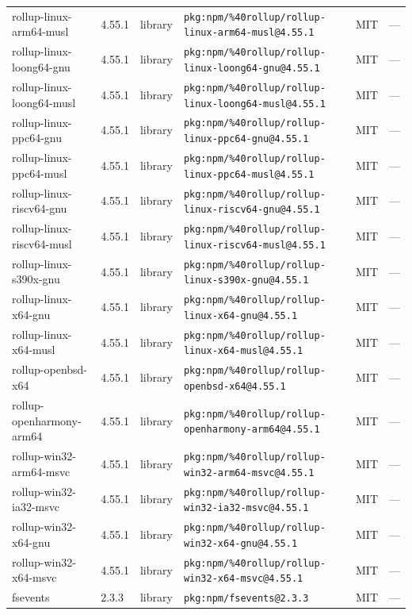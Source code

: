 \documentclass[11pt]{article}
\begin{document}
\begin{longtable}{|l|l|l|p{2.2cm}|l|p{4cm}|}
rollup-linux-arm64-musl & 4.55.1 & library & \texttt{pkg:npm/\%40rollup/rollup-linux-arm64-musl@4.55.1} & MIT & — \\
rollup-linux-loong64-gnu & 4.55.1 & library & \texttt{pkg:npm/\%40rollup/rollup-linux-loong64-gnu@4.55.1} & MIT & — \\
rollup-linux-loong64-musl & 4.55.1 & library & \texttt{pkg:npm/\%40rollup/rollup-linux-loong64-musl@4.55.1} & MIT & — \\
rollup-linux-ppc64-gnu & 4.55.1 & library & \texttt{pkg:npm/\%40rollup/rollup-linux-ppc64-gnu@4.55.1} & MIT & — \\
rollup-linux-ppc64-musl & 4.55.1 & library & \texttt{pkg:npm/\%40rollup/rollup-linux-ppc64-musl@4.55.1} & MIT & — \\
rollup-linux-riscv64-gnu & 4.55.1 & library & \texttt{pkg:npm/\%40rollup/rollup-linux-riscv64-gnu@4.55.1} & MIT & — \\
rollup-linux-riscv64-musl & 4.55.1 & library & \texttt{pkg:npm/\%40rollup/rollup-linux-riscv64-musl@4.55.1} & MIT & — \\
rollup-linux-s390x-gnu & 4.55.1 & library & \texttt{pkg:npm/\%40rollup/rollup-linux-s390x-gnu@4.55.1} & MIT & — \\
rollup-linux-x64-gnu & 4.55.1 & library & \texttt{pkg:npm/\%40rollup/rollup-linux-x64-gnu@4.55.1} & MIT & — \\
rollup-linux-x64-musl & 4.55.1 & library & \texttt{pkg:npm/\%40rollup/rollup-linux-x64-musl@4.55.1} & MIT & — \\
rollup-openbsd-x64 & 4.55.1 & library & \texttt{pkg:npm/\%40rollup/rollup-openbsd-x64@4.55.1} & MIT & — \\
rollup-openharmony-arm64 & 4.55.1 & library & \texttt{pkg:npm/\%40rollup/rollup-openharmony-arm64@4.55.1} & MIT & — \\
rollup-win32-arm64-msvc & 4.55.1 & library & \texttt{pkg:npm/\%40rollup/rollup-win32-arm64-msvc@4.55.1} & MIT & — \\
rollup-win32-ia32-msvc & 4.55.1 & library & \texttt{pkg:npm/\%40rollup/rollup-win32-ia32-msvc@4.55.1} & MIT & — \\
rollup-win32-x64-gnu & 4.55.1 & library & \texttt{pkg:npm/\%40rollup/rollup-win32-x64-gnu@4.55.1} & MIT & — \\
rollup-win32-x64-msvc & 4.55.1 & library & \texttt{pkg:npm/\%40rollup/rollup-win32-x64-msvc@4.55.1} & MIT & — \\
fsevents & 2.3.3 & library & \texttt{pkg:npm/fsevents@2.3.3} & MIT & — \\

\end{longtable}
\end{document}
